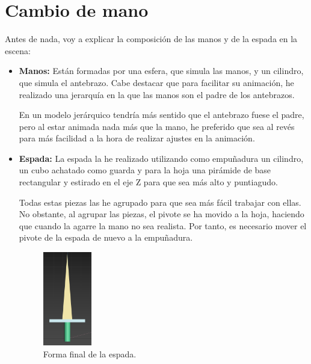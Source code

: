 
\section{Cambio de mano}

Antes de nada, voy a explicar la composición de las manos y de la espada en la escena:

\begin{itemize}
\item \textbf{Manos: }Están formadas por una esfera, que simula las manos, y un cilindro, que simula el antebrazo. Cabe destacar que para facilitar su animación, he realizado una jerarquía en la que las manos son el padre de los antebrazos.

En un modelo jerárquico tendría más sentido que el antebrazo fuese el padre, pero al estar animada nada más que la mano, he preferido que sea al revés para más facilidad a la hora de realizar ajustes en la animación.

\item \textbf{Espada: }La espada la he realizado utilizando como empuñadura un cilindro, un cubo achatado como guarda y para la hoja una pirámide de base rectangular y estirado en el eje Z para que sea más alto y puntiagudo.

\bigskip

Todas estas piezas las he agrupado para que sea más fácil trabajar con ellas. No obstante, al agrupar las piezas, el pivote se ha movido a la hoja, haciendo que cuando la agarre la mano no sea realista. Por tanto, es necesario mover el pivote de la espada de nuevo a la empuñadura.

\begin{figure}[H]
    \centering
    \includegraphics[width=0.2\textwidth]{imagenes/espada.png}
    \caption{Forma final de la espada.}
\end{figure}
\end{itemize}

\bigskip

